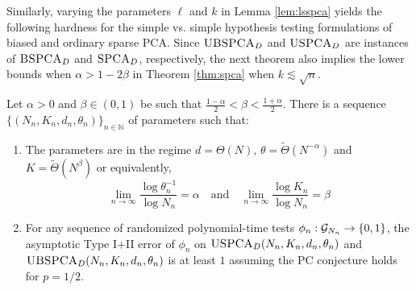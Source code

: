 Similarly, varying the parameters $\ell$ and $k$ in Lemma \ref{lem:lsspca} yields the following hardness for the simple vs. simple hypothesis testing formulations of biased and ordinary sparse PCA. Since $\textsc{UBSPCA}_D$ and $\textsc{USPCA}_D$ are instances of $\textsc{BSPCA}_D$ and $\textsc{SPCA}_D$, respectively, the next theorem also implies the lower bounds when $\alpha > 1 - 2\beta$ in Theorem \ref{thm:spca} when $k \lesssim \sqrt{n}$.

\begin{theorem}
Let $\alpha > 0$ and $\beta \in (0, 1)$ be such that $\frac{1 - \alpha}{2} < \beta < \frac{1 + \alpha}{2}$. There is a sequence $\{ (N_n, K_n, d_n, \theta_n) \}_{n \in \mathbb{N}}$ of parameters such that:
\begin{enumerate}
\item The parameters are in the regime $d = \Theta(N)$, $\theta = \tilde{\Theta}(N^{-\alpha})$ and $K = \tilde{\Theta}(N^\beta)$ or equivalently,
$$\lim_{n \to \infty} \frac{\log \theta_n^{-1}}{\log N_n} = \alpha \quad \text{and} \quad \lim_{n \to \infty} \frac{\log K_n}{\log N_n} = \beta$$
\item For any sequence of randomized polynomial-time tests $\phi_n : \mathcal{G}_{N_n} \to \{0, 1\}$, the asymptotic Type I$+$II error of $\phi_n$ on $\textsc{USPCA}_D(N_n, K_n, d_n, \theta_n)$ and $\textsc{UBSPCA}_D(N_n, K_n, d_n, \theta_n)$ is at least $1$ assuming the PC conjecture holds for $p = 1/2$.
\end{enumerate}
\end{theorem}

